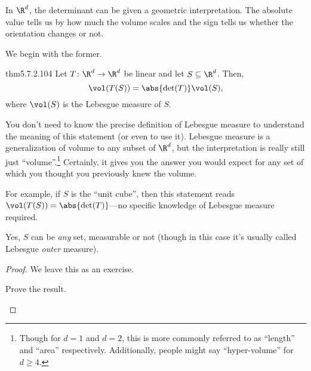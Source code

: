 In $\R ^d$, the determinant can be given a geometric interpretation.  The absolute value tells us by how much the volume scales and the sign tells us whether the orientation changes or not.

We begin with the former.
\begin{thm}{}{thm5.7.2.104}
	Let $T\colon \R ^d\rightarrow \R ^d$ be linear and let $S\subseteq \R ^d$.  Then,
	\begin{equation}
		\vol (T(S))=\abs{\det (T)}\vol (S),
	\end{equation}
	where $\vol (S)$ is the Lebesgue measure of $S$.
	\begin{rmk}
		You don't need to know the precise definition of Lebesgue measure to understand the meaning of this statement (or even to use it).  Lebesgue measure is a generalization of volume to any subset of $\R ^d$, but the interpretation is really still just ``volume''.\footnote{Though for $d=1$ and $d=2$, this is more commonly referred to as ``length'' and ``area'' respectively.  Additionally, people might say ``hyper-volume'' for $d\geq 4$.}  Certainly, it gives you the answer you would expect for any set of which you thought you previously knew the volume.
		
		For example, if $S$ is the ``unit cube'', then this statement reads $\vol (T(S))=\abs{\det (T)}$---no specific knowledge of Lebesgue measure required.
	\end{rmk}
	\begin{rmk}
		Yes, $S$ can be \emph{any} set, measurable or not (though in this case it's usually called Lebesgue \emph{outer} measure).
	\end{rmk}
	\begin{proof}
		We leave this as an exercise.
		\begin{exr}[breakable=false]{}{}
			Prove the result.
		\end{exr}
	\end{proof}
\end{thm}

